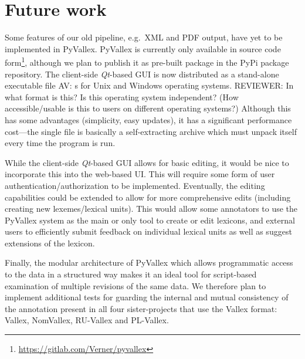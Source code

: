 \documentclass[10pt, a4paper]{article}
\newcommand{\av}[1]{{\color{ansa} AV: #1}}
\newcommand{\rrr}[1]{{\color{red} REVIEWER: #1}}
\begin{document}
\section{Future work}
Some features of our old pipeline,
e.g.\ XML and PDF output,
have yet to be implemented in PyVallex.
PyVallex is currently only available in source code form\footnote{\url{https://gitlab.com/Verner/pyvallex}}, 
although we plan to publish it as pre-built
package in the PyPi package repository. The client-side \emph{Qt}-based GUI is now distributed as a stand-alone
executable file\av{s for Unix and Windows operating systems}.
\rrr{In what format is this? Is this operating system independent? (How accessible/usable is this to users on different operating systems?)}
Although this has some advantages (simplicity, easy updates), it has a significant
performance cost---the single file is basically a self-extracting archive which must unpack itself
every time the program is run.

While the client-side \emph{Qt}-based GUI allows for basic editing, it would be nice to incorporate this into
the web-based UI. This will require some form of user authentication/authorization to be implemented.
Eventually, the editing capabilities could be extended to allow for more comprehensive
edits (including creating new lexemes/lexical units). This would allow some annotators
to use the PyVallex system as the main or only tool to create or edit
lexicons, and external users to efficiently submit feedback on individual lexical units as well as suggest extensions of the lexicon.

Finally, the modular architecture of PyVallex which allows programmatic access to the data in a structured
way makes it an ideal tool for script-based examination of multiple revisions of the same data.
We therefore plan to implement additional tests for guarding the internal and mutual consistency of the annotation present in all four sister-projects that use the Vallex format: Vallex, NomVallex, RU-Vallex and PL-Vallex.
\end{document}
